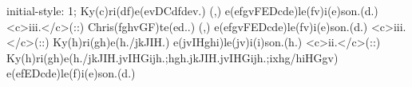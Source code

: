 initial-style: 1;
Ky(c)ri(df)e(evDCdfdev.) (,) e(efgvFEDcde)le(fv)i(e)son.(d.) <c>iii.</c>(::) Chris(fghvGF)te(ed..) (,) e(efgvFEDcde)le(fv)i(e)son.(d.) <c>iii.</c>(::) Ky(h)ri(gh)e(h./jkJIH.) e(jvIHghi)le(jv)i(i)son.(h.) <c>ii.</c>(::) Ky(h)ri(gh)e(h./jkJIH.jvIHGijh.;hgh.jkJIH.jvIHGijh.;ixhg/hiHGgv) e(efEDcde)le(f)i(e)son.(d.)
